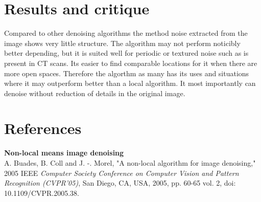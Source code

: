 \documentclass[12pt, letterpaper]{article}
\begin{document}
\section{Results and critique}
Compared to other denoising algorithms the method noise extracted from the image shows very little structure. The algorithm may not perform noticibly better depending, but it is suited well for periodic or textured noise such as is present in CT scans. Its easier to find comparable locations for it when there are more open spaces. Therefore the algorthm as many has its uses and situations where it may outperform better than a local algorithm. It most importantly can denoise without reduction of details in the original image.


\centering
\section*{References}
\textbf{Non-local means image denoising}\\
A. Buades, B. Coll and J. -. Morel, "A non-local algorithm for image denoising," 2005 IEEE \textit{Computer Society Conference on Computer Vision and Pattern Recognition (CVPR'05)}, San Diego, CA, USA, 2005, pp. 60-65 vol. 2, doi: 10.1109/CVPR.2005.38.

\pagebreak
\centering
\end{document}
